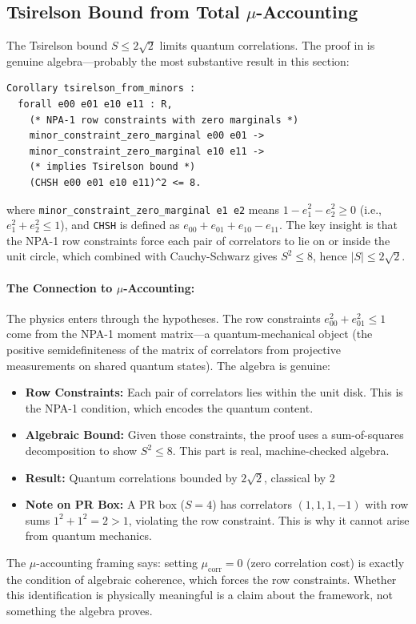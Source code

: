 \subsection{Tsirelson Bound from Total $\mu$-Accounting}

The Tsirelson bound $S \le 2\sqrt{2}$ limits quantum correlations. The proof in  is genuine algebra---probably the most substantive result in this section:
\begin{lstlisting}
Corollary tsirelson_from_minors :
  forall e00 e01 e10 e11 : R,
    (* NPA-1 row constraints with zero marginals *)
    minor_constraint_zero_marginal e00 e01 ->
    minor_constraint_zero_marginal e10 e11 ->
    (* implies Tsirelson bound *)
    (CHSH e00 e01 e10 e11)^2 <= 8.
\end{lstlisting}

where \texttt{minor\_constraint\_zero\_marginal e1 e2} means $1 - e_1^2 - e_2^2 \ge 0$ (i.e., $e_1^2 + e_2^2 \le 1$), and \texttt{CHSH} is defined as $e_{00} + e_{01} + e_{10} - e_{11}$. The key insight is that the NPA-1 row constraints force each pair of correlators to lie on or inside the unit circle, which combined with Cauchy-Schwarz gives $S^2 \le 8$, hence $|S| \le 2\sqrt{2}$.

\paragraph{The Connection to $\mu$-Accounting:}
The physics enters through the hypotheses. The row constraints $e_{00}^2 + e_{01}^2 \leq 1$ come from the NPA-1 moment matrix---a quantum-mechanical object (the positive semidefiniteness of the matrix of correlators from projective measurements on shared quantum states). The algebra is genuine:
\begin{itemize}
    \item \textbf{Row Constraints:} Each pair of correlators lies within the unit disk. This is the NPA-1 condition, which encodes the quantum content.
    \item \textbf{Algebraic Bound:} Given those constraints, the proof uses a sum-of-squares decomposition to show $S^2 \leq 8$. This part is real, machine-checked algebra.
    \item \textbf{Result:} Quantum correlations bounded by $2\sqrt{2}$, classical by 2
    \item \textbf{Note on PR Box:} A PR box ($S=4$) has correlators $(1,1,1,-1)$ with row sums $1^2+1^2=2>1$, violating the row constraint. This is why it cannot arise from quantum mechanics.
\end{itemize}
The $\mu$-accounting framing says: setting $\mu_{\text{corr}} = 0$ (zero correlation cost) is exactly the condition of algebraic coherence, which forces the row constraints. Whether this identification is physically meaningful is a claim about the framework, not something the algebra proves.

